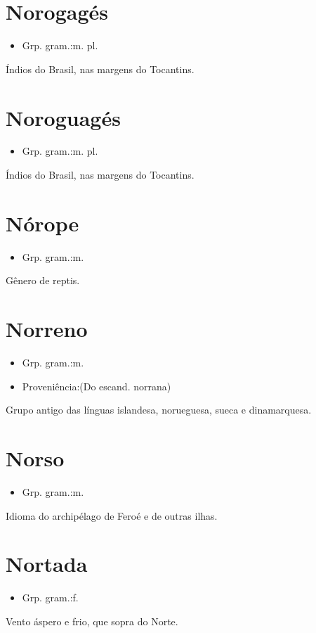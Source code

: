 \section{Norogagés}
\begin{itemize}
\item {Grp. gram.:m. pl.}
\end{itemize}
Índios do Brasil, nas margens do Tocantins.
\section{Noroguagés}
\begin{itemize}
\item {Grp. gram.:m. pl.}
\end{itemize}
Índios do Brasil, nas margens do Tocantins.
\section{Nórope}
\begin{itemize}
\item {Grp. gram.:m.}
\end{itemize}
Gênero de reptis.
\section{Norreno}
\begin{itemize}
\item {Grp. gram.:m.}
\end{itemize}
\begin{itemize}
\item {Proveniência:(Do escand. \textunderscore norrana\textunderscore )}
\end{itemize}
Grupo antigo das línguas islandesa, norueguesa, sueca e dinamarquesa.
\section{Norso}
\begin{itemize}
\item {Grp. gram.:m.}
\end{itemize}
Idioma do archipélago de Feroé e de outras ilhas.
\section{Nortada}
\begin{itemize}
\item {Grp. gram.:f.}
\end{itemize}
Vento áspero e frio, que sopra do Norte.
